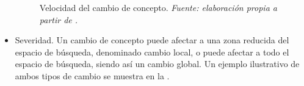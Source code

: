 \documentclass[c5paper,10pt,twoside]{book}	   	%
\begin{document}
\begin{itemize}
\begin{figure}[!hbtp]
	\centering
	\caption[Velocidad del cambio de concepto]{Velocidad del cambio de concepto. \textit{Fuente: elaboración propia a partir de \cite{Rkgwh17}.}}
	\label{fig:velocidadCambio}
\end{figure}
	
	\item Severidad. Un cambio de concepto puede afectar a una zona reducida del espacio de búsqueda, denominado cambio local, o puede afectar a todo el espacio de búsqueda, siendo así un cambio global. Un ejemplo ilustrativo de ambos tipos de cambio se muestra en la .
	

\end{itemize}
\end{document}
